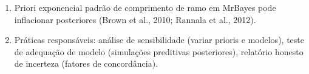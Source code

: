 \begin{revise}
\begin{enumerate}[itemsep=0pt, topsep=0pt, parsep=0pt]
    \item Priori exponencial padrão de comprimento de ramo em MrBayes pode inflacionar posteriores (Brown et al., 2010; Rannala et al., 2012).
    \item Práticas responsáveis: análise de sensibilidade (variar prioris e modelos), teste de adequação de modelo (simulações preditivas posteriores), relatório honesto de incerteza (fatores de concordância).
\end{enumerate}
\end{revise}

\clearpage

\printbibliography[heading=subbibliography,title={Referências}]

